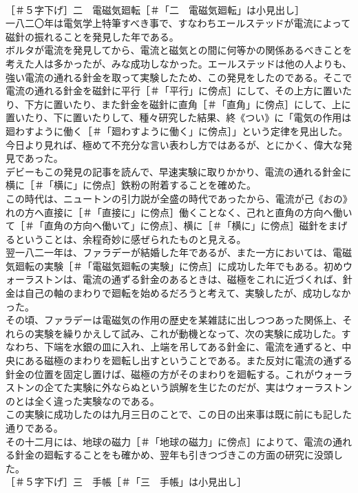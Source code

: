 \documentclass[8pt]{extreport}
\begin{document}
\begin{CJK}{UTF8}{min}
\\	［＃５字下げ］二　電磁気廻転［＃「二　電磁気廻転」は小見出し］
\\	一八二〇年は電気学上特筆すべき事で、すなわちエールステッドが電流によって磁針の振れることを発見した年である。
\\	ボルタが電流を発見してから、電流と磁気との間に何等かの関係あるべきことを考えた人は多かったが、みな成功しなかった。エールステッドは他の人よりも、強い電流の通れる針金を取って実験したため、この発見をしたのである。そこで電流の通れる針金を磁針に平行［＃「平行」に傍点］にして、その上方に置いたり、下方に置いたり、また針金を磁針に直角［＃「直角」に傍点］にして、上に置いたり、下に置いたりして、種々研究した結果、終《つい》に「電気の作用は廻わすように働く［＃「廻わすように働く」に傍点］」という定律を見出した。今日より見れば、極めて不充分な言い表わし方ではあるが、とにかく、偉大な発見であった。
\\	デビーもこの発見の記事を読んで、早速実験に取りかかり、電流の通れる針金に横に［＃「横に」に傍点］鉄粉の附着することを確めた。
\\	この時代は、ニュートンの引力説が全盛の時代であったから、電流が己《おの》れの方へ直接に［＃「直接に」に傍点］働くことなく、己れと直角の方向へ働いて［＃「直角の方向へ働いて」に傍点］、横に［＃「横に」に傍点］磁針をまげるということは、余程奇妙に感ぜられたものと見える。
\\	翌一八二一年は、ファラデーが結婚した年であるが、また一方においては、電磁気廻転の実験［＃「電磁気廻転の実験」に傍点］に成功した年でもある。初めウォーラストンは、電流の通ずる針金のあるときは、磁極をこれに近づくれば、針金は自己の軸のまわりで廻転を始めるだろうと考えて、実験したが、成功しなかった。
\\	その頃、ファラデーは電磁気の作用の歴史を某雑誌に出しつつあった関係上、それらの実験を繰りかえして試み、これが動機となって、次の実験に成功した。すなわち、下端を水銀の皿に入れ、上端を吊してある針金に、電流を通ずると、中央にある磁極のまわりを廻転し出すということである。また反対に電流の通ずる針金の位置を固定し置けば、磁極の方がそのまわりを廻転する。これがウォーラストンの企てた実験に外ならぬという誤解を生じたのだが、実はウォーラストンのとは全く違った実験なのである。
\\	この実験に成功したのは九月三日のことで、この日の出来事は既に前にも記した通りである。
\\	その十二月には、地球の磁力［＃「地球の磁力」に傍点］によりて、電流の通れる針金の廻転することをも確かめ、翌年も引きつづきこの方面の研究に没頭した。
\\	［＃５字下げ］三　手帳［＃「三　手帳」は小見出し］

\end{CJK}
\end{document}

